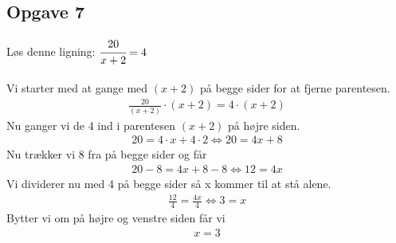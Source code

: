\subsection{Opgave 7}

Løs denne ligning: $\cfrac{20}{x+2} = 4$\\\\

\ans
Vi starter med at gange med $(x + 2)$ på begge sider for at fjerne parentesen.
\begin{align*}
    \frac{20}{(x+2)} \cdot (x + 2) = 4 \cdot (x + 2) 
\end{align*}
Nu ganger vi de 4 ind i parentesen $(x + 2)$ på højre siden.
\begin{align*}
    20 = 4\cdot x + 4\cdot 2  \Leftrightarrow 20 = 4x + 8
\end{align*}
Nu trækker vi 8 fra på begge sider og får
\begin{align*}
    20 - 8 = 4x + 8 - 8 \Leftrightarrow 12 = 4x
\end{align*}
Vi dividerer nu med 4 på begge sider så x kommer til at stå alene.
\begin{align*}
    \frac{12}{4} = \frac{4x}{4} \Leftrightarrow 3 = x
\end{align*}
Bytter vi om på højre og venstre siden får vi
\begin{align*}
    x = 3
\end{align*}